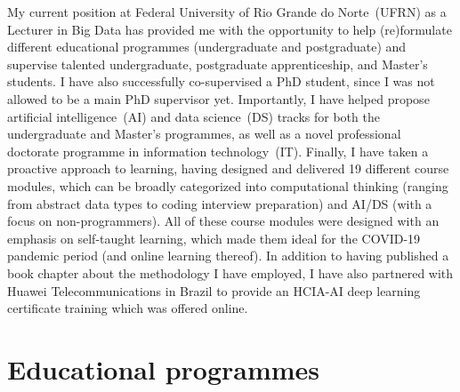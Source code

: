 

My current position at Federal University of Rio Grande do Norte~(UFRN) as a Lecturer in Big Data has provided me with the opportunity to help (re)formulate different educational programmes (undergraduate and postgraduate) and supervise talented undergraduate, postgraduate apprenticeship, and Master's students. I have also successfully co-supervised a PhD student, since I was not allowed to be a main PhD supervisor yet. Importantly, I have helped propose artificial intelligence~(AI) and data science~(DS) tracks for both the undergraduate and Master's programmes, as well as a novel professional doctorate programme in information technology~(IT). Finally, I have taken a proactive approach to learning, having designed and delivered 19 different course modules, which can be broadly categorized into computational thinking (ranging from abstract data types to coding interview preparation) and AI/DS (with a focus on non-programmers). All of these course modules were designed with an emphasis on self-taught learning, which made them ideal for the COVID-19 pandemic period (and online learning thereof). In addition to having published a book chapter about the methodology I have employed, I have also partnered with Huawei Telecommunications in Brazil to provide an HCIA-AI deep learning certificate training which was offered online.%

\section{Educational programmes}

